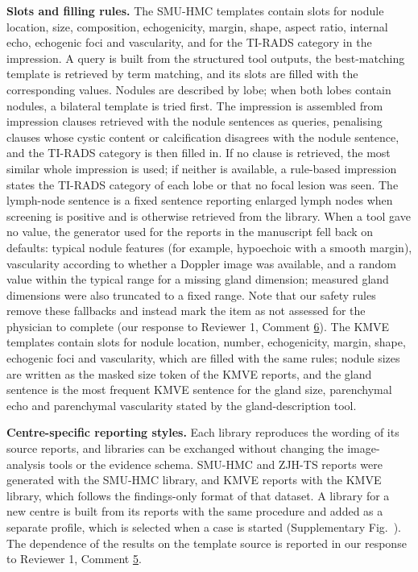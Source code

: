 \textbf{Slots and filling rules.} The SMU-HMC templates contain slots for nodule location, size, composition, echogenicity, margin, shape, aspect ratio, internal echo, echogenic foci and vascularity, and for the TI-RADS category in the impression. A query is built from the structured tool outputs, the best-matching template is retrieved by term matching, and its slots are filled with the corresponding values. Nodules are described by lobe; when both lobes contain nodules, a bilateral template is tried first. The impression is assembled from impression clauses retrieved with the nodule sentences as queries, penalising clauses whose cystic content or calcification disagrees with the nodule sentence, and the TI-RADS category is then filled in. If no clause is retrieved, the most similar whole impression is used; if neither is available, a rule-based impression states the TI-RADS category of each lobe or that no focal lesion was seen. The lymph-node sentence is a fixed sentence reporting enlarged lymph nodes when screening is positive and is otherwise retrieved from the library. When a tool gave no value, the generator used for the reports in the manuscript fell back on defaults: typical nodule features (for example, hypoechoic with a smooth margin), vascularity according to whether a Doppler image was available, and a random value within the typical range for a missing gland dimension; measured gland dimensions were also truncated to a fixed range. Note that our safety rules remove these fallbacks and instead mark the item as not assessed for the physician to complete (our response to Reviewer 1, Comment \hyperref[rev:R1.6]{6}). The KMVE templates contain slots for nodule location, number, echogenicity, margin, shape, echogenic foci and vascularity, which are filled with the same rules; nodule sizes are written as the masked size token of the KMVE reports, and the gland sentence is the most frequent KMVE sentence for the gland size, parenchymal echo and parenchymal vascularity stated by the gland-description tool.\par

\textbf{Centre-specific reporting styles.} Each library reproduces the wording of its source reports, and libraries can be exchanged without changing the image-analysis tools or the evidence schema. SMU-HMC and ZJH-TS reports were generated with the SMU-HMC library, and KMVE reports with the KMVE library, which follows the findings-only format of that dataset. A library for a new centre is built from its reports with the same procedure and added as a separate profile, which is selected when a case is started (Supplementary Fig.~\SuppFigTemplateBank{}). The dependence of the results on the template source is reported in our response to Reviewer 1, Comment \hyperref[rev:R1.5]{5}.\par


